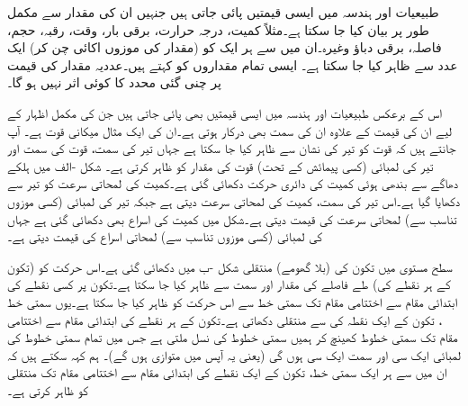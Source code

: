 طبیعیات اور ہندسہ میں ایسی قیمتیں پائی جاتی ہیں جنہیں ان کی مقدار سے مکمل طور پر بیان کیا جا سکتا ہے۔مثلاً  کمیت، درجہ حرارت، برقی بار، وقت، رقبہ، حجم، فاصلہ، برقی دباؤ وغیرہ۔ان میں سے ہر ایک کو (مقدار کی موزوں اکائی چن کر) ایک عدد  سے ظاہر کیا جا سکتا ہے۔ ایسی تمام مقداروں کو  کہتے ہیں۔عددیہ مقدار کی قیمت پر چنی گئی محدد کا کوئی اثر نہیں ہو گا۔

اس کے برعکس طبیعیات اور ہندسہ میں ایسی قیمتیں بھی پائی جاتی ہیں جن کی مکمل اظہار کے لیے ان کی قیمت کے علاوہ ان کی سمت بھی درکار ہوتی ہے۔ان کی ایک مثال میکانی  قوت ہے۔ آپ جانتے ہیں کہ قوت کو تیر کی نشان سے ظاہر کیا جا سکتا ہے جہاں تیر کی سمت، قوت کی سمت اور تیر کی لمبائی (کسی پیمائش کے تحت) قوت کی مقدار کو ظاہر کرتی ہے۔ شکل -الف میں ہلکے دھاگے سے بندھی ہوئی کمیت  کی دائری حرکت دکھائی گئی ہے۔کمیت کی لمحاتی سرعت  کو تیر سے دکھایا گیا ہے۔اس تیر کی سمت، کمیت کی  لمحاتی سرعت دیتی ہے جبکہ تیر کی لمبائی (کسی موزوں تناسب سے) لمحاتی سرعت کی قیمت دیتی ہے۔شکل میں کمیت کی اسراع  بھی دکھائی گئی ہے جہاں  کی لمبائی (کسی موزوں تناسب سے) لمحاتی اسراع کی قیمت دیتی ہے۔

سطح مستوی میں تکون کی (بلا گھومے) منتقلی شکل -ب میں  دکھائی گئی ہے۔اس حرکت کو (تکون کے ہر نقطے کی) طے فاصلے  کی مقدار اور سمت سے ظاہر کیا جا سکتا ہے۔تکون پر کسی نقطے کی ابتدائی مقام  سے اختتامی مقام  تک سمتی خط سے اس حرکت کو ظاہر کیا جا سکتا ہے۔یوں سمتی خط ، تکون کے ایک نقطہ کی  سے  منتقلی دکھاتی ہے۔تکون کے ہر نقطے کی ابتدائی مقام سے اختتامی مقام تک سمتی خطوط کھینچ کر ہمیں سمتی خطوط کی نسل ملتی ہے جس میں تمام سمتی  خطوط کی لمبائی ایک سی   اور  سمت  ایک سی ہوں گی (یعنی یہ آپس میں متوازی ہوں گے)۔ ہم کہہ سکتے ہیں کہ ان میں سے ہر ایک سمتی خط، تکون کے ایک نقطے کی ابتدائی مقام سے اختتامی مقام تک منتقلی کو ظاہر کرتی ہے۔ 


